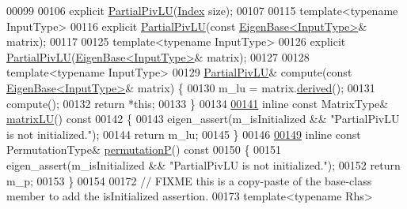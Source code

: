 \begin{DoxyCode}
00099 
00106     \textcolor{keyword}{explicit} \hyperlink{group___l_u___module_class_eigen_1_1_partial_piv_l_u}{PartialPivLU}(\hyperlink{namespace_eigen_a62e77e0933482dafde8fe197d9a2cfde}{Index} size);
00107 
00115     \textcolor{keyword}{template}<\textcolor{keyword}{typename} InputType>
00116     \textcolor{keyword}{explicit} \hyperlink{group___l_u___module_class_eigen_1_1_partial_piv_l_u}{PartialPivLU}(\textcolor{keyword}{const} \hyperlink{group___core___module_struct_eigen_1_1_eigen_base}{EigenBase<InputType>}& matrix);
00117 
00125     \textcolor{keyword}{template}<\textcolor{keyword}{typename} InputType>
00126     \textcolor{keyword}{explicit} \hyperlink{group___l_u___module_class_eigen_1_1_partial_piv_l_u}{PartialPivLU}(\hyperlink{group___core___module_struct_eigen_1_1_eigen_base}{EigenBase<InputType>}& matrix);
00127 
00128     \textcolor{keyword}{template}<\textcolor{keyword}{typename} InputType>
00129     \hyperlink{group___l_u___module_class_eigen_1_1_partial_piv_l_u}{PartialPivLU}& compute(\textcolor{keyword}{const} \hyperlink{group___core___module_struct_eigen_1_1_eigen_base}{EigenBase<InputType>}& matrix) \{
00130       m\_lu = matrix.\hyperlink{group___core___module_a324b16961a11d2ecfd2d1b7dd7946545}{derived}();
00131       compute();
00132       \textcolor{keywordflow}{return} *\textcolor{keyword}{this};
00133     \}
00134 
\hyperlink{group___l_u___module_abea0d7e51c5591a6db152eade0892d9c}{00141}     \textcolor{keyword}{inline} \textcolor{keyword}{const} MatrixType& \hyperlink{group___l_u___module_abea0d7e51c5591a6db152eade0892d9c}{matrixLU}()\textcolor{keyword}{ const}
00142 \textcolor{keyword}{    }\{
00143       eigen\_assert(m\_isInitialized && \textcolor{stringliteral}{"PartialPivLU is not initialized."});
00144       \textcolor{keywordflow}{return} m\_lu;
00145     \}
00146 
\hyperlink{group___l_u___module_a1c637530b3215787668a75ebb2e7b882}{00149}     \textcolor{keyword}{inline} \textcolor{keyword}{const} PermutationType& \hyperlink{group___l_u___module_a1c637530b3215787668a75ebb2e7b882}{permutationP}()\textcolor{keyword}{ const}
00150 \textcolor{keyword}{    }\{
00151       eigen\_assert(m\_isInitialized && \textcolor{stringliteral}{"PartialPivLU is not initialized."});
00152       \textcolor{keywordflow}{return} m\_p;
00153     \}
00154 
00172     \textcolor{comment}{// FIXME this is a copy-paste of the base-class member to add the isInitialized assertion.}
00173     \textcolor{keyword}{template}<\textcolor{keyword}{typename} Rhs>

\end{DoxyCode}
